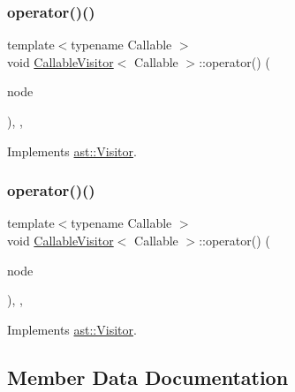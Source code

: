\subsubsection{\texorpdfstring{operator()()}{operator()()}\hspace{0.1cm}{\footnotesize\ttfamily [42/43]}}
{\footnotesize\ttfamily template$<$typename Callable $>$ \\
void \hyperlink{struct_callable_visitor}{Callable\+Visitor}$<$ Callable $>$\+::operator() (\begin{DoxyParamCaption}\item[{const \hyperlink{structast_1_1_property_assignment}{Property\+Assignment} \&}]{node }\end{DoxyParamCaption})\hspace{0.3cm}{\ttfamily [inline]}, {\ttfamily [override]}, {\ttfamily [virtual]}}



Implements \hyperlink{structast_1_1_visitor_aa8c11e082a0099f7f558b9957378997b}{ast\+::\+Visitor}.

\mbox{\label{struct_callable_visitor_aa70a97d5a44ecc30aac8fb97c12cabb6}} 
\subsubsection{\texorpdfstring{operator()()}{operator()()}\hspace{0.1cm}{\footnotesize\ttfamily [43/43]}}
{\footnotesize\ttfamily template$<$typename Callable $>$ \\
void \hyperlink{struct_callable_visitor}{Callable\+Visitor}$<$ Callable $>$\+::operator() (\begin{DoxyParamCaption}\item[{const \hyperlink{structast_1_1_arguments}{Arguments} \&}]{node }\end{DoxyParamCaption})\hspace{0.3cm}{\ttfamily [inline]}, {\ttfamily [override]}, {\ttfamily [virtual]}}



Implements \hyperlink{structast_1_1_visitor_ae1bb70b6440910706372359ac6706283}{ast\+::\+Visitor}.



\subsection{Member Data Documentation}
\mbox{\label{struct_callable_visitor_a52ce52c399eb34a2a16abec3361e48b8}} 
